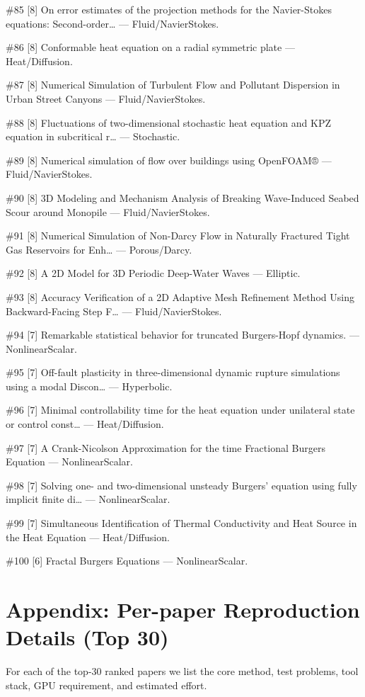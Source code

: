 \documentclass[10pt,letterpaper]{article}
\begin{document}
\#85 [8] On error estimates of the projection methods for the Navier-Stokes equations: Second-order… — Fluid/NavierStokes.

\#86 [8] Conformable heat equation on a radial symmetric plate — Heat/Diffusion.

\#87 [8] Numerical Simulation of Turbulent Flow and Pollutant Dispersion in Urban Street Canyons — Fluid/NavierStokes.

\#88 [8] Fluctuations of two-dimensional stochastic heat equation and KPZ equation in subcritical r… — Stochastic.

\#89 [8] Numerical simulation of flow over buildings using OpenFOAM® — Fluid/NavierStokes.

\#90 [8] 3D Modeling and Mechanism Analysis of Breaking Wave-Induced Seabed Scour around Monopile — Fluid/NavierStokes.

\#91 [8] Numerical Simulation of Non-Darcy Flow in Naturally Fractured Tight Gas Reservoirs for Enh… — Porous/Darcy.

\#92 [8] A 2D Model for 3D Periodic Deep-Water Waves — Elliptic.

\#93 [8] Accuracy Verification of a 2D Adaptive Mesh Refinement Method Using Backward-Facing Step F… — Fluid/NavierStokes.

\#94 [7] Remarkable statistical behavior for truncated Burgers-Hopf dynamics. — NonlinearScalar.

\#95 [7] Off-fault plasticity in three-dimensional dynamic rupture simulations using a modal Discon… — Hyperbolic.

\#96 [7] Minimal controllability time for the heat equation under unilateral state or control const… — Heat/Diffusion.

\#97 [7] A Crank-Nicolson Approximation for the time Fractional Burgers Equation — NonlinearScalar.

\#98 [7] Solving one- and two-dimensional unsteady Burgers' equation using fully implicit finite di… — NonlinearScalar.

\#99 [7] Simultaneous Identification of Thermal Conductivity and Heat Source in the Heat Equation — Heat/Diffusion.

\#100 [6] Fractal Burgers Equations — NonlinearScalar.


\section{Appendix: Per-paper Reproduction Details (Top 30)}

For each of the top-30 ranked papers we list the core method, test problems, tool stack,
GPU requirement, and estimated effort.
\end{document}
